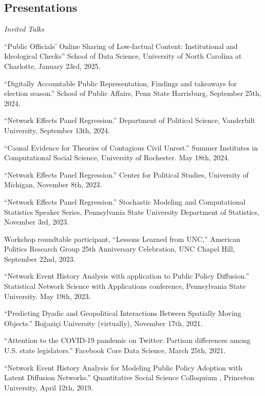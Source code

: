 \documentclass[overlapped,line]{res}
\begin{document}
\begin{resume}
\section{\bf Presentations}
\vspace{.1cm}
\hspace{-1cm} \emph{Invited Talks}
\begin{etaremune} 
\item ``Public Officials' Online Sharing of Low-factual Content: Institutional and Ideological Checks'' School of Data Science, University of North Carolina at Charlotte, January 23rd, 2025. 
\item ``Digitally Accountable Public Representation, Findings and takeaways for election season.'' School of Public Affairs, Penn State Harrisburg, September 25th, 2024. 
\item ``Network Effects Panel Regression.'' Department of Political Science, Vanderbilt University, September 13th, 2024.
\item ``Causal Evidence for Theories of Contagious Civil Unrest.'' Summer Institutes in Computational Social Science, University of Rochester. May 18th, 2024. 
\item ``Network Effects Panel Regression.'' Center for Political Studies, University of Michigan, November 8th, 2023.
\item ``Network Effects Panel Regression.'' Stochastic Modeling and Computational Statistics Speaker Series, Pennsylvania State University Department of Statistics, November 3rd, 2023.
\item Workshop roundtable participant, ``Lessons Learned from UNC,'' American Politics Research Group 25th Anniversary Celebration, UNC Chapel Hill, September 22nd, 2023. 
\item ``Network Event History Analysis with application to Public Policy Diffusion.'' Statistical Network Science with Applications conference, Pennsylvania State University. May 19th, 2023.
\item ``Predicting Dyadic and Geopolitical Interactions Between Spatially Moving Objects.'' Boğaziçi University (virtually), November 17th, 2021.
\item ``Attention to the COVID-19 pandemic on Twitter: Partisan differences among U.S. state legislators.'' Facebook Core Data Science, March 25th, 2021.
\item ``Network Event History Analysis for Modeling Public Policy Adoption with Latent Diffusion Networks.''  Quantitative Social Science Colloquium , Princeton University, April 12th, 2019.

\end{etaremune}
\end{resume}
\end{document}
